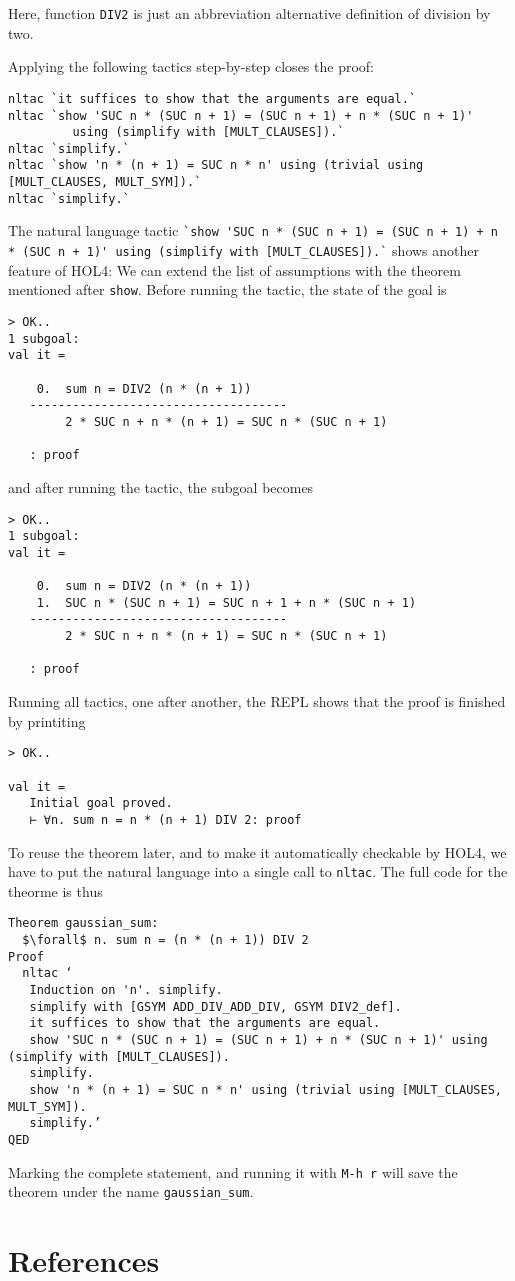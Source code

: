 \documentclass[10pt]{scrartcl}
\newcommand{\ekey}[1]{\texttt{#1}}
\begin{document}
Here, function \lstinline{DIV2} is just an abbreviation alternative definition
of division by two.

Applying the following tactics step-by-step closes the proof:

\begin{lstlisting}
nltac `it suffices to show that the arguments are equal.`
nltac `show 'SUC n * (SUC n + 1) = (SUC n + 1) + n * (SUC n + 1)'
         using (simplify with [MULT_CLAUSES]).`
nltac `simplify.`
nltac `show 'n * (n + 1) = SUC n * n' using (trivial using [MULT_CLAUSES, MULT_SYM]).`
nltac `simplify.`
\end{lstlisting}

\begin{sloppypar}
The natural language tactic \lstinline{`show 'SUC n * (SUC n + 1) = (SUC n + 1) + n * (SUC n + 1)' using (simplify with [MULT_CLAUSES]).`}
shows another feature of HOL4:
We can extend the list of assumptions with the theorem mentioned after
\lstinline{show}.
Before running the tactic, the state of the goal is
\end{sloppypar}
\begin{lstlisting}
> OK..
1 subgoal:
val it =

    0.  sum n = DIV2 (n * (n + 1))
   ------------------------------------
        2 * SUC n + n * (n + 1) = SUC n * (SUC n + 1)

   : proof
\end{lstlisting}

and after running the tactic, the subgoal becomes
\begin{lstlisting}
> OK..
1 subgoal:
val it =

    0.  sum n = DIV2 (n * (n + 1))
    1.  SUC n * (SUC n + 1) = SUC n + 1 + n * (SUC n + 1)
   ------------------------------------
        2 * SUC n + n * (n + 1) = SUC n * (SUC n + 1)

   : proof
\end{lstlisting}

Running all tactics, one after another, the REPL shows that the proof is finished by printiting
\begin{lstlisting}
> OK..

val it =
   Initial goal proved.
   ⊢ ∀n. sum n = n * (n + 1) DIV 2: proof
\end{lstlisting}

To reuse the theorem later, and to make it automatically checkable by HOL4, we
have to put the natural language into a single call to \lstinline{nltac}.
The full code for the theorme is thus
\begin{lstlisting}[mathescape=true]
Theorem gaussian_sum:
  $\forall$ n. sum n = (n * (n + 1)) DIV 2
Proof
  nltac ‘
   Induction on 'n'. simplify.
   simplify with [GSYM ADD_DIV_ADD_DIV, GSYM DIV2_def].
   it suffices to show that the arguments are equal.
   show 'SUC n * (SUC n + 1) = (SUC n + 1) + n * (SUC n + 1)' using (simplify with [MULT_CLAUSES]).
   simplify.
   show 'n * (n + 1) = SUC n * n' using (trivial using [MULT_CLAUSES, MULT_SYM]).
   simplify.’
QED
\end{lstlisting}

Marking the complete statement, and running it with \ekey{M-h r} will save the
theorem under the name \lstinline{gaussian_sum}.

\section{References}
\printbibliography
\end{document}
